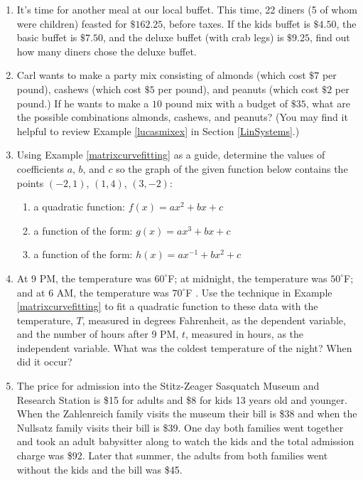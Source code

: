 \documentclass{ximera}
\begin{document}
\begin{enumerate}
\setcounter{enumi}{\value{HW}}

\item  It's time for another meal at our local buffet.  This time, 22 diners (5 of whom were children) feasted for $\$162.25$, before taxes.  If the kids buffet is $\$4.50$, the basic buffet is $\$7.50$, and the deluxe buffet (with crab legs) is $\$9.25$, find out how many diners chose the deluxe buffet. 

\item Carl wants to make a party mix consisting of almonds (which cost $\$7$ per pound), cashews (which cost $\$5$ per pound), and peanuts (which cost $\$2$ per pound.)  If he wants to make a $10$ pound mix with a budget of $\$35$, what are the possible combinations almonds, cashews, and peanuts?  (You may find it helpful to review Example \ref{lucasmixex} in Section \ref{LinSystems}.)


\item  \label{threepointsmatrixfunctionfitex}Using Example \ref{matrixcurvefitting} as a guide,  determine the values of coefficients $a$, $b$, and $c$ so the graph of the given function below contains the points $(-2,1)$, $(1,4)$, $(3,-2)$:

\begin{enumerate}

\item a quadratic function: $f(x) = ax^2+bx+c$

\item  a function of the form: $g(x) = ax^3+bx+c$ 

\item a function of the form:  $h(x) = ax^{-1}+bx^2+c$

\end{enumerate}


\item  At 9 PM, the temperature was $60^{\circ}$F; at midnight, the temperature was $50^{\circ}$F; and at 6 AM, the temperature was $70^{\circ}$F .  Use the technique in Example \ref{matrixcurvefitting} to fit a quadratic function to these data with the temperature, $T$, measured in degrees Fahrenheit, as the dependent variable, and the number of hours after 9 PM, $t$, measured in hours, as the independent variable. What was the coldest temperature of the night?  When did it occur? 

\item The price for admission into the Stitz-Zeager Sasquatch Museum and Research Station is \$15 for adults and \$8 for kids 13 years old and younger. When the Zahlenreich family visits the museum their bill is \$38 and when the Nullsatz family visits their bill is \$39.  One day both families went together and took an adult babysitter along to watch the kids and the total admission charge was \$92.  Later that summer, the adults from both families went without the kids and the bill was \$45.  


\end{enumerate}
\end{document}
